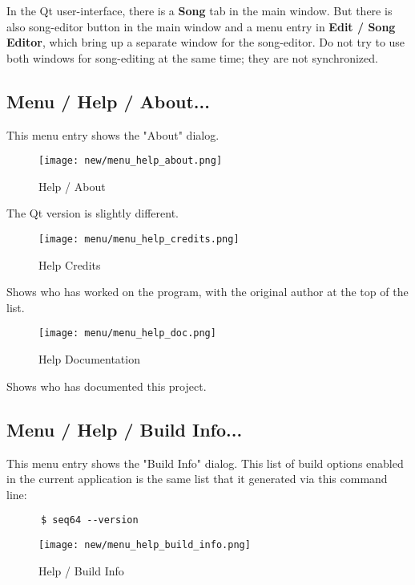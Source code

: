    In the Qt user-interface, there is a \textbf{Song} tab in the main window.
   But there is also song-editor button in the main window
   and a menu entry in \textbf{Edit / Song Editor},
   which bring up a separate window for the song-editor.
   Do not try to use both windows for song-editing at the same time; they
   are not synchronized.

\subsection{Menu / Help / About...}
\label{subsec:seq64_menu_about}

   This menu entry shows the "About" dialog.

\begin{figure}[H]
   \centering 
   \texttt{[image: new/menu\_help\_about.png]}
   \caption{Help / About}
   \label{fig:seq64_menu_help_about}
\end{figure}

   The Qt version is slightly different.

\begin{figure}[H]
   \centering 
   \texttt{[image: menu/menu\_help\_credits.png]}
   \caption{Help Credits}
   \label{fig:seq64_menu_help_credits}
\end{figure}

   Shows who has worked on the program, with the original author at the top
   of the list.

\begin{figure}[H]
   \centering 
   \texttt{[image: menu/menu\_help\_doc.png]}
   \caption{Help Documentation}
   \label{fig:seq64_menu_help_doc}
\end{figure}

   Shows who has documented this project.

\subsection{Menu / Help / Build Info...}
\label{subsec:seq64_menu_build_info}

   This menu entry shows the "Build Info" dialog.  This list of
   build options enabled in the current application is the same list
   that it generated via this command line:

   \begin{verbatim}
      $ seq64 --version
   \end{verbatim}

\begin{figure}[H]
   \centering 
   \texttt{[image: new/menu\_help\_build\_info.png]}
   \caption{Help / Build Info}
   \label{fig:seq64_menu_help_build_info}
\end{figure}


